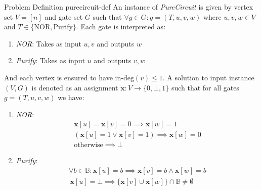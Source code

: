 \begin{definitionbox}{ Problem Definition \cite{deligkas_PureCircuitTightInapproximability_2024}}{purecircuit-def}
	An instance of \textit{PureCircuit} is given by vertex set $V= [n]$ and gate set $G$ such that
	$\forall g \in G: g=(T,u,v,w)$ where $u,v,w \in V$ and $T \in \{\text{NOR}, \text{Purify}\}$.
	Each gate is interpreted as:
	\begin{enumerate}
		\item \textit{NOR}: Takes as input $u,v$ and outputs $w$
		\item \textit{Purify}: Takes as input $u$ and outputs $v,w$
	\end{enumerate}
	And each vertex is ensured to have $\text{in-deg}(v) \leq 1$.
	A solution to input instance $(V,G)$ is denoted as an assignment $\mathbf{x} : V \to \{0, \bot, 1\}$
	such that for all gates $g = (T,u,v,w)$ we have:
	\begin{enumerate}
		\item \textit{NOR}:
			  \begin{gather*}
				  \mathbf{x}[u] = \mathbf{x}[v] = 0 \implies \mathbf{x}[w] = 1\\
				  (\mathbf{x}[u] =1 \vee \mathbf{x}[v] =1) \implies \mathbf{x}[w] = 0 \\
				  \text{otherwise} \implies \bot
			  \end{gather*}

		\item \textit{Purify}:
			  \begin{gather*}
				  \forall b \in \mathbb{B}: \mathbf{x}[u] = b \implies \mathbf{x}[v] = b \wedge \mathbf{x}[w] =  b\\
				\, \mathbf{x}[u] = \bot \implies \{\mathbf{x}[v] \cup \mathbf{x}[w] \} \cap \mathbb{B}\neq \emptyset
			\, \end{gather*}
	\end{enumerate}
\end{definitionbox}

